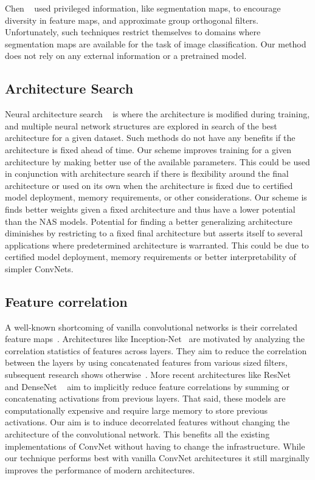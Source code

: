 Chen \etal ~\cite{Chen2017TrainingGO} used privileged information, like segmentation maps, to encourage diversity in feature maps, and approximate group orthogonal filters.
Unfortunately, such techniques restrict themselves to domains where segmentation maps are available for the task of image classification. 
Our method does not rely on any external information or a pretrained model.

\subsection{Architecture Search } 

Neural architecture search ~\cite{Liu2017ProgressiveNA, Real2018RegularizedEF, Zoph2016NeuralAS} is where the architecture is modified during training, and multiple neural network structures are explored in search of the best architecture for a given dataset. 
Such methods do not have any benefits if the architecture is fixed ahead of time. Our scheme improves training for a given architecture by making better use of the available parameters. 
This could be used in conjunction with architecture search if there is flexibility around the final architecture or used on its own when the architecture is fixed due to certified model deployment, memory requirements, or other considerations.
Our scheme is finds better weights given a fixed architecture and thus have a lower potential than the NAS models.
Potential for finding a better generalizing architecture diminishes by restricting to a fixed final architecture but asserts itself to several applications where predetermined architecture is warranted.
This could be due to certified model deployment, memory requirements or better interpretability of simpler ConvNets.

\subsection{Feature correlation } 
A well-known shortcoming of vanilla convolutional networks is their correlated feature maps~\cite{Cogswell2015ReducingOI, Glorot2010UnderstandingTD}.
Architectures like Inception-Net~\cite{Szegedy2015GoingDW} are motivated by analyzing the correlation statistics of features across layers.
They aim to reduce the correlation between the layers by using concatenated features from various sized filters, subsequent research shows otherwise~\cite{Raghu2017SVCCASV}.
More recent architectures like ResNet~\cite{He2016DeepRL} and DenseNet ~\cite{Huang2017DenselyCC} aim to implicitly reduce feature correlations by summing or concatenating activations from previous layers.
That said, these models are computationally expensive and require large memory to store previous activations.
Our aim is to induce decorrelated features without changing the architecture of the convolutional network.
This benefits all the existing implementations of ConvNet without having to change the infrastructure.
While our technique performs best with vanilla ConvNet architectures it still marginally improves the performance of modern architectures.

